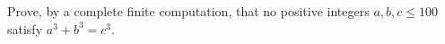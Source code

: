 Prove, by a complete finite computation, that no positive integers $a,b,c\le100$ satisfy $a^3+b^3=c^3$.
